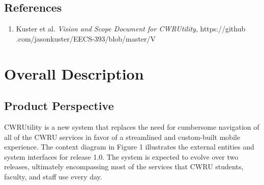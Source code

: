 \documentclass[pdftex,12pt,letter]{article}
\begin{document}
\subsection{References}
\begin{enumerate}[1.]
\item Kuster et al. \emph{Vision and Scope Document for CWRUtility}, https://github\\.com/jasonkuster/EECS-393/blob/master/V%
\end{enumerate}

\section{Overall Description}
\subsection{Product Perspective}
CWRUtility is a new system that replaces the need for cumbersome navigation of all of the CWRU services in favor of a streamlined and custom-built mobile experience. The context diagram in Figure 1 illustrates the external entities and system interfaces for release 1.0. The system is expected to evolve over two releases, ultimately encompassing most of the services that CWRU students, faculty, and staff use every day.
\end{document}
